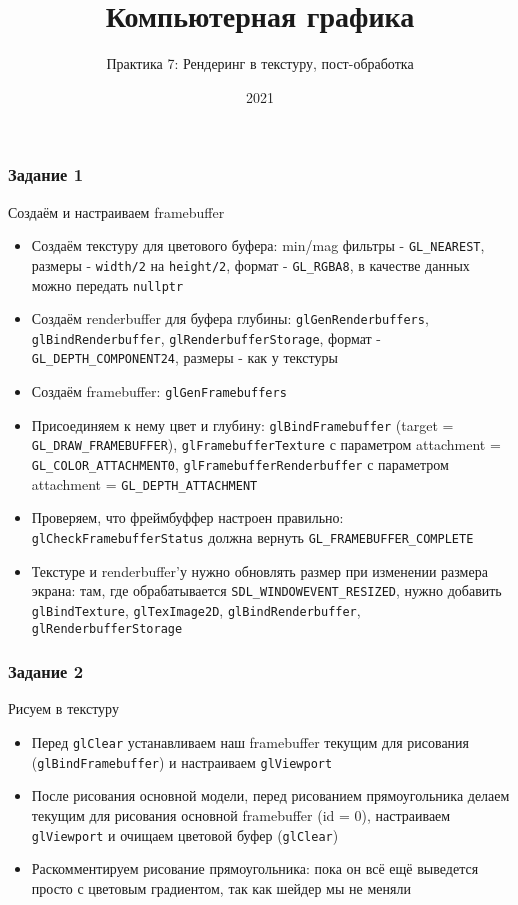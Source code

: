 \documentclass{beamer}
\title{Компьютерная графика}
\subtitle{Практика 7: Рендеринг в текстуру, пост-обработка}
\date{2021}
\begin{document}
\frame{\titlepage}

\begin{frame}[fragile]
\frametitle{Задание 1}
\fontsize{10pt}{10pt}
Создаём и настраиваем framebuffer
\begin{itemize}
\item Создаём текстуру для цветового буфера: min/mag фильтры - \verb|GL_NEAREST|, размеры - \verb|width/2| на \verb|height/2|, формат - \verb|GL_RGBA8|, в качестве данных можно передать \verb|nullptr|
\pause
\item Создаём renderbuffer для буфера глубины: \verb|glGenRenderbuffers|, \verb|glBindRenderbuffer|, \verb|glRenderbufferStorage|, формат - \verb|GL_DEPTH_COMPONENT24|, размеры - как у текстуры
\pause
\item Создаём framebuffer: \verb|glGenFramebuffers|
\pause
\item Присоединяем к нему цвет и глубину: \verb|glBindFramebuffer| (target = \verb|GL_DRAW_FRAMEBUFFER|), \verb|glFramebufferTexture| с параметром attachment = \verb|GL_COLOR_ATTACHMENT0|, \verb|glFramebufferRenderbuffer| с параметром attachment = \verb|GL_DEPTH_ATTACHMENT|
\pause
\item Проверяем, что фреймбуффер настроен правильно: \verb|glCheckFramebufferStatus| должна вернуть \verb|GL_FRAMEBUFFER_COMPLETE|
\pause
\item Текстуре и renderbuffer'у нужно обновлять размер при изменении размера экрана: там, где обрабатывается \verb|SDL_WINDOWEVENT_RESIZED|, нужно добавить \verb|glBindTexture|, \verb|glTexImage2D|, \verb|glBindRenderbuffer|, \verb|glRenderbufferStorage|
\end{itemize}
\end{frame}

\begin{frame}[fragile]
\frametitle{Задание 2}
Рисуем в текстуру
\begin{itemize}
\item Перед \verb|glClear| устанавливаем наш framebuffer текущим для рисования (\verb|glBindFramebuffer|) и настраиваем \verb|glViewport|
\pause
\item После рисования основной модели, перед рисованием прямоугольника делаем текущим для рисования основной framebuffer (id = 0), настраиваем \verb|glViewport| и очищаем цветовой буфер (\verb|glClear|)
\pause
\item Раскомментируем рисование прямоугольника: пока он всё ещё выведется просто с цветовым градиентом, так как шейдер мы не меняли
\end{itemize}
\end{frame}
\end{document}
